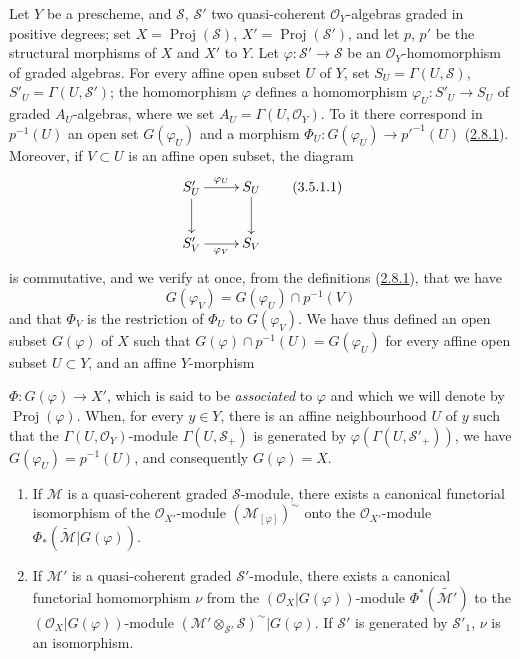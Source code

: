 \begin{env}[3.5.1]
\label{II.3.5.1}
Let $Y$ be a prescheme, and $\mathcal{S}$, $\mathcal{S}'$ two quasi-coherent
$\mathcal{O}_Y$-algebras graded in positive degrees; set
$X=\operatorname{Proj}(\mathcal{S})$, $X'=\operatorname{Proj}(\mathcal{S}')$,
and let $p$, $p'$ be the structural morphisms of $X$ and $X'$ to $Y$. Let
$\varphi:\mathcal{S}'\to\mathcal{S}$ be an $\mathcal{O}_Y$-homomorphism
of graded algebras. For every affine open subset $U$ of $Y$, set
$S_U=\Gamma(U,\mathcal{S})$, $S'_U=\Gamma(U,\mathcal{S}')$;
the homomorphism $\varphi$ defines a homomorphism
$\varphi_U:S'_U\to S_U$ of graded $A_U$-algebras, where we set
$A_U=\Gamma(U,\mathcal{O}_Y)$. To it there correspond in $p^{-1}(U)$ an open
set $G(\varphi_U)$ and a morphism
$\Phi_U:G(\varphi_U)\to p'^{-1}(U)$
(\hyperref[II.2.8.1]{2.8.1}). Moreover, if $V\subset U$ is an affine open
subset, the diagram
\[
\label{II.3.5.1.1}
  \xymatrix{
    S'_U\ar[r]^{\varphi_U}\ar[d]
    & S_U\ar[d]\\
    S'_V\ar[r]_{\varphi_V}
    & S_V
  }
\tag{3.5.1.1}
\]
is commutative, and we verify at once, from the definitions
(\hyperref[II.2.8.1]{2.8.1}), that we have
\[
  G(\varphi_V)=G(\varphi_U)\cap p^{-1}(V)
\]
and that $\Phi_V$ is the restriction of $\Phi_U$ to $G(\varphi_V)$. We have
thus defined an open subset $G(\varphi)$ of $X$ such that
$G(\varphi)\cap p^{-1}(U)=G(\varphi_U)$ for every affine open subset $U\subset Y$,
and an affine $Y$-morphism


$\Phi:G(\varphi)\to X'$, which is said to be \emph{associated} to $\varphi$ and
which we will denote by $\operatorname{Proj}(\varphi)$. When, for every
$y\in Y$, there is an affine neighbourhood $U$ of $y$ such that the
$\Gamma(U,\mathcal{O}_Y)$-module $\Gamma(U,\mathcal{S}_+)$ is generated by
$\varphi(\Gamma(U,\mathcal{S}'_+))$, we have
$G(\varphi_U)=p^{-1}(U)$, and consequently $G(\varphi)=X$.
\end{env}

\begin{proposition}[3.5.2]
\label{II.3.5.2}
\begin{enumerate}
  \item[\rm(i)] If $\mathcal{M}$ is a quasi-coherent graded
    $\mathcal{S}$-module, there exists a canonical functorial isomorphism
    of the $\mathcal{O}_{X'}$-module $(\mathcal{M}_{[\varphi]})^{\sim}$ onto
    the $\mathcal{O}_{X'}$-module
    $\Phi_*(\widetilde{\mathcal{M}}|G(\varphi))$.
  \item[\rm(ii)] If $\mathcal{M}'$ is a quasi-coherent graded
    $\mathcal{S}'$-module, there exists a canonical functorial homomorphism
    $\nu$ from the $(\mathcal{O}_X|G(\varphi))$-module
    $\Phi^*(\widetilde{\mathcal{M}'})$ to the
    $(\mathcal{O}_X|G(\varphi))$-module
    $(\mathcal{M}'\otimes_{\mathcal{S}'}\mathcal{S})^{\sim}|G(\varphi)$. If
    $\mathcal{S}'$ is generated by $\mathcal{S}'_1$, $\nu$ is an
    isomorphism.
\end{enumerate}
\end{proposition}

